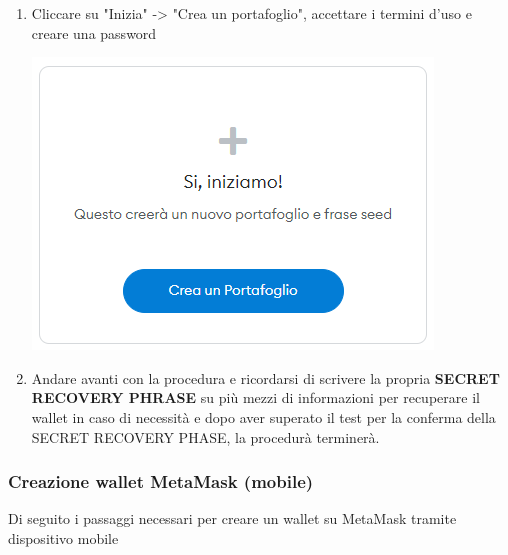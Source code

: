 \begin{enumerate}
\begin{center}
    \end{center}
    \item Cliccare su "Inizia" -> "Crea un portafoglio", accettare i termini d’uso e creare una password \\
         \begin{center}
    \includegraphics[scale = 0.4]{img/Wallet.PNG}
    \end{center}
    \item Andare avanti con la procedura e ricordarsi di scrivere la propria \textbf{SECRET RECOVERY PHRASE} su più mezzi di informazioni per recuperare il wallet in caso di necessità e dopo aver superato il test per la conferma della SECRET RECOVERY PHASE, la procedurà terminerà.
    
\end{enumerate}

\subsubsection{Creazione wallet MetaMask (mobile)}

Di seguito i passaggi necessari per creare un wallet su MetaMask tramite dispositivo mobile

